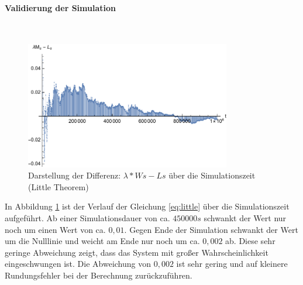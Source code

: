 \paragraph{Validierung der Simulation}
\\
\begin{figure}[htpb]
	\centering
	\includegraphics[width=0.8\textwidth]{abbildungen/1_Phone_VIP/Arrival_400_Serve_100_dur_1000000_Skip_0/LittleSystem.pdf}
	\caption{Darstellung der Differenz: $\lambda * Ws - Ls$ über die Simulationszeit (Little Theorem)}
	\label{fig:LittleSystemVIP400}
\end{figure}

In Abbildung \ref{fig:LittleSystemVIP400} ist der Verlauf der Gleichung \ref{eq:little} über die Simulationszeit aufgeführt. Ab einer Simulationsdauer von ca. $450000s$ schwankt der Wert nur noch um einen Wert von ca. $0,01$. Gegen Ende der Simulation schwankt der Wert um die Nulllinie und weicht am Ende nur noch um ca. $0,002$ ab. Diese sehr geringe Abweichung zeigt, dass das System mit großer Wahrscheinlichkeit eingeschwungen ist. Die Abweichung von $0,002$ ist sehr gering und auf kleinere Rundungsfehler bei der Berechnung zurückzuführen.

